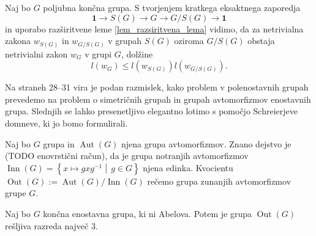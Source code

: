 Naj bo $G$ poljubna končna grupa. S tvorjenjem kratkega eksaktnega zaporedja \begin{equation*}
\mathbf{1} \to S(G) \to G \to  G / S(G) \to  \mathbf{1}
\end{equation*}  
in uporabo razširitvene leme \ref{lem_razsiritvena_lema} vidimo, da za netrivialna zakona $w_{S(G)}$ in $w_{G / S(G)}$ v grupah $S(G)$ oziroma $G / S(G)$ obstaja netrivialni zakon $w_G$ v grupi $G$, dolžine \begin{equation*}
l(w_G) \le  l(w_{S(G)}) l (w_{G / S(G)}).
\end{equation*}  

Na straneh 28--31 vira \cite{Schneider_2016} je podan razmislek, kako problem v polenostavnih grupah prevedemo na problem o simetričnih grupah in grupah avtomorfizmov enostavnih grupa. Slednjih se lahko presenetljivo elegantno lotimo s pomočjo Schreierjeve domneve, ki jo bomo formulirali.

\begin{definicija}
\label{def_grupa_zunanjih_avtomorfizmov}
Naj bo $G$ grupa in $\operatorname{Aut}(G)$ njena grupa avtomorfizmov. Znano dejstvo je (TODO enovrstični račun), da je grupa notranjih avtomorfizmov $\operatorname{Inn}(G) = \left\{ x \mapsto g x g^{-1}  \middle|\,  g \in G  \right\}$ njena edinka.
Kvocientu $\operatorname{Out}(G) :=  \operatorname{Aut}(G)  /  \operatorname{Inn}(G)$ rečemo grupa zunanjih avtomorfizmov grupe $G$. 
\end{definicija}

\begin{izrek}
\label{izr_Schreierjeva_domneva}
 Naj bo $G$ končna enostavna grupa, ki ni Abelova. Potem je grupa $\operatorname{Out}(G)$ rešljiva razreda največ $3$.
\end{izrek}


